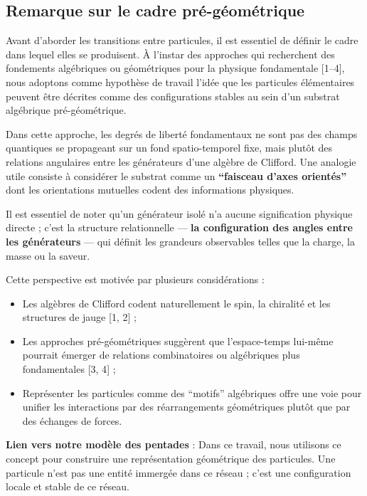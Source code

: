 \documentclass[11pt]{article}
\providecommand{\tightlist}{%
\setlength{\itemsep}{2pt}\setlength{\parskip}{6pt}
}
\begin{document}
\hypertarget{remarque-sur-le-cadre-pruxe9-guxe9omuxe9trique}{%
\subsection{Remarque sur le cadre
pré-géométrique}\label{remarque-sur-le-cadre-pruxe9-guxe9omuxe9trique}}

Avant d'aborder les transitions entre particules, il est essentiel de
définir le cadre dans lequel elles se produisent. À l'instar des
approches qui recherchent des fondements algébriques ou géométriques
pour la physique fondamentale {[}1--4{]}, nous adoptons comme hypothèse
de travail l'idée que les particules élémentaires peuvent être décrites
comme des configurations stables au sein d'un substrat algébrique
pré-géométrique.

Dans cette approche, les degrés de liberté fondamentaux ne sont pas des
champs quantiques se propageant sur un fond spatio-temporel fixe, mais
plutôt des relations angulaires entre les générateurs d'une algèbre de
Clifford. Une analogie utile consiste à considérer le substrat comme un
\textbf{``faisceau d'axes orientés''} dont les orientations mutuelles
codent des informations physiques.

Il est essentiel de noter qu'un générateur isolé n'a aucune
signification physique directe ; c'est la structure relationnelle ---
\textbf{la configuration des angles entre les générateurs} --- qui
définit les grandeurs observables telles que la charge, la masse ou la
saveur.

Cette perspective est motivée par plusieurs considérations :

\begin{itemize}
\tightlist
\item
  Les algèbres de Clifford codent naturellement le spin, la chiralité et
  les structures de jauge {[}1, 2{]} ;
\item
  Les approches pré-géométriques suggèrent que l'espace-temps lui-même
  pourrait émerger de relations combinatoires ou algébriques plus
  fondamentales {[}3, 4{]} ;
\item
  Représenter les particules comme des ``motifs'' algébriques offre une
  voie pour unifier les interactions par des réarrangements géométriques
  plutôt que par des échanges de forces.
\end{itemize}

\textbf{Lien vers notre modèle des pentades} : Dans ce travail, nous
utilisons ce concept pour construire une représentation géométrique des
particules. Une particule n'est pas une entité immergée dans ce réseau ;
c'est une configuration locale et stable de ce réseau.
\end{document}
